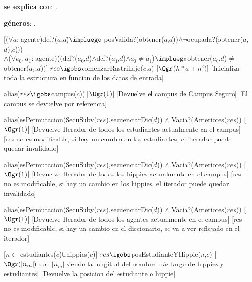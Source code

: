 \begin{Interfaz}
	\textbf{se explica con}: .

	\textbf{géneros}: .


	[($\forall a$: agente)def?($a$,$d$)$\impluego$ posValida?(obtener($a$,$d$))$\land \neg$ocupada?(obtener($a$,$d$),$c$)))\\
  $\land$($\forall a_0,a_1$: agente)((def?($a_0$,$d$)$\land$def?($a_1$,$d$)$\land a_0 \neq a_1$)$\impluego$obtener($a_0$,$d$)$\neq$obtener($a_1$,$d$))]
	{$res \igobs $comenzarRastrillaje($c$,$d$)}%
	[$\Ogr$($h*a + n^2$)]
	[Inicializa toda la estructura en funcion de los datos de entrada]

	{alias($res \igobs $campus($c$))}
	[$\Ogr(1)$]
	[Devuelve el campus de Campus Seguro]
	[El campus se devuelve por referencia]

	{alias(esPermutacion(SecuSuby($res$),secuenciarDic($d$)) $\land$ Vacia?(Anteriores($res$))}
	[$\Ogr(1)$]
	[Devuelve Iterador de todos los estudiantes actualmente en el campus]
	[res no es modificable, si hay un cambio en los estudiantes, el iterador puede quedar invalidado]
  
	{alias(esPermutacion(SecuSuby($res$),secuenciarDic($d$)) $\land$ Vacia?(Anteriores($res$))}
	[$\Ogr(1)$]
	[Devuelve Iterador de todos los hippies actualmente en el campus]
	[res no es modificable, si hay un cambio en los hippies, el iterador puede quedar invalidado]

	{alias(esPermutacion(SecuSuby($res$),secuenciarDic($d$)) $\land$ Vacia?(Anteriores($res$))}
	[$\Ogr(1)$]
	[Devuelve Iterador de todos los agentes actualmente en el campus]
	[res no es modificable, si hay un cambio en el diccionario, se va a ver reflejado en el iterador]

	[$n \in$ estudiantes($c$)$\cup$hippies($c$)]
	{$res \igobs$posEstudianteYHippie($n$,$c$)}
	[$\Ogr(|n_m|)$ con $|n_m|$ siendo la longitud del nombre más largo de hippies y estudiantes]
	[Devuelve la posicion del estudiante o hippie]


\end{Interfaz}
